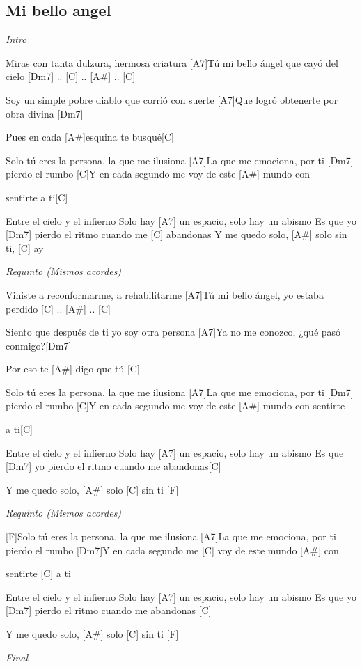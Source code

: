 \subsection{Mi bello angel}

\noindent
\vspace{1cm}

\begin{guitar}
	\begin{multicols}{2}

		\textit{Intro}
		\par
		[F]Miras con tanta dulzura, hermosa criatura
		[A7]Tú mi bello ángel que cayó del cielo [Dm7] .. [C] .. [A#] .. [C] \par
		[F]Soy un simple pobre diablo que corrió con suerte
		[A7]Que logró obtenerte por obra divina [Dm7] \par
		[C]Pues en cada [A#]esquina te busqué[C] \par
		[F]Solo tú eres la persona, la que me ilusiona
		[A7]La que me emociona, por ti [Dm7] pierdo el rumbo
		[C]Y en cada segundo me voy de este [A#] mundo con \par sentirte a ti[C] \par
		[F]Entre el cielo y el infierno
		Solo hay [A7] un espacio, solo hay un abismo
		Es que yo [Dm7] pierdo el ritmo cuando me [C] abandonas
		Y me quedo solo, [A#] solo sin ti, [C] ay\par
		\par
		\textit{Requinto (Mismos acordes)}
		\par
		[F]Viniste a reconformarme, a rehabilitarme
		[A7]Tú mi bello ángel, yo estaba perdido [C] .. [A#] .. [C] \par
		[F]Siento que después de ti yo soy otra persona
		[A7]Ya no me conozco, ¿qué pasó conmigo?[Dm7] \par
		[C]Por eso te [A#] digo que tú [C] \par
		[F]Solo tú eres la persona, la que me ilusiona
		[A7]La que me emociona, por ti [Dm7] pierdo el rumbo
		[C]Y en cada segundo me voy de este [A#] mundo con sentirte \par a ti[C] \par
		[F]Entre el cielo y el infierno
		Solo hay [A7] un espacio, solo hay un abismo
		Es que [Dm7] yo pierdo el ritmo cuando me abandonas[C] \par
		Y me quedo solo, [A#] solo [C] sin ti [F] \par 
		\par
		\textit{Requinto (Mismos acordes)}

		[F]Solo tú eres la persona, la que me ilusiona
		[A7]La que me emociona, por ti pierdo el rumbo
		[Dm7]Y en cada segundo me [C] voy de este mundo [A#] con \par sentirte [C] a ti  \par
		[F]Entre el cielo y el infierno
		Solo hay [A7] un espacio, solo hay un abismo
		Es que yo [Dm7] pierdo el ritmo cuando me abandonas [C] \par
		Y me quedo solo, [A#] solo [C] sin ti [F] \par
		\par
		\textit{Final}
	\end{multicols}
\end{guitar}
